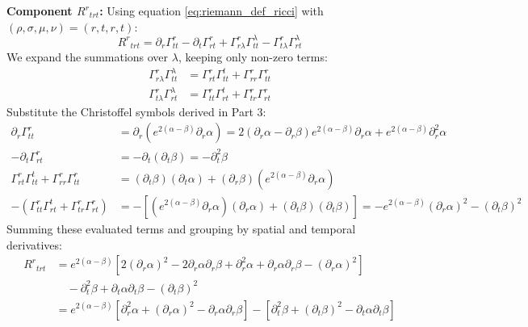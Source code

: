 \documentclass[11pt, a4paper]{report}
\begin{document}
\textbf{Component ${R^r}_{trt}$:}
Using equation \eqref{eq:riemann_def_ricci} with $(\rho, \sigma, \mu, \nu) = (r, t, r, t)$:
\begin{equation}
    {R^r}_{trt} = \partial_r \Gamma^r_{tt} - \partial_t \Gamma^r_{rt} + \Gamma^r_{r\lambda}\Gamma^\lambda_{tt} - \Gamma^r_{t\lambda}\Gamma^\lambda_{rt}
\end{equation}
We expand the summations over $\lambda$, keeping only non-zero terms:
\begin{align}
    \Gamma^r_{r\lambda}\Gamma^\lambda_{tt} &= \Gamma^r_{rt}\Gamma^t_{tt} + \Gamma^r_{rr}\Gamma^r_{tt} \\
    \Gamma^r_{t\lambda}\Gamma^\lambda_{rt} &= \Gamma^r_{tt}\Gamma^t_{rt} + \Gamma^r_{tr}\Gamma^r_{rt}
\end{align}
Substitute the Christoffel symbols derived in Part 3:
\begin{align}
    \partial_r \Gamma^r_{tt} &= \partial_r \left( e^{2(\alpha - \beta)} \partial_r \alpha \right) = 2(\partial_r \alpha - \partial_r \beta) e^{2(\alpha - \beta)} \partial_r \alpha + e^{2(\alpha - \beta)} \partial_r^2 \alpha \\
    -\partial_t \Gamma^r_{rt} &= -\partial_t (\partial_t \beta) = -\partial_t^2 \beta \\
    \Gamma^r_{rt}\Gamma^t_{tt} + \Gamma^r_{rr}\Gamma^r_{tt} &= (\partial_t \beta)(\partial_t \alpha) + (\partial_r \beta) \left( e^{2(\alpha - \beta)} \partial_r \alpha \right) \\
    -\left( \Gamma^r_{tt}\Gamma^t_{rt} + \Gamma^r_{tr}\Gamma^r_{rt} \right) &= -\left[ \left( e^{2(\alpha - \beta)} \partial_r \alpha \right) (\partial_r \alpha) + (\partial_t \beta)(\partial_t \beta) \right] = -e^{2(\alpha - \beta)} (\partial_r \alpha)^2 - (\partial_t \beta)^2
\end{align}
Summing these evaluated terms and grouping by spatial and temporal derivatives:
\begin{align}
    {R^r}_{trt} &= e^{2(\alpha - \beta)} \left[ 2(\partial_r \alpha)^2 - 2\partial_r \alpha \partial_r \beta + \partial_r^2 \alpha + \partial_r \alpha \partial_r \beta - (\partial_r \alpha)^2 \right] \nonumber \\
    &\quad - \partial_t^2 \beta + \partial_t \alpha \partial_t \beta - (\partial_t \beta)^2 \nonumber \\
    &= e^{2(\alpha - \beta)} \left[ \partial_r^2 \alpha + (\partial_r \alpha)^2 - \partial_r \alpha \partial_r \beta \right] - \left[ \partial_t^2 \beta + (\partial_t \beta)^2 - \partial_t \alpha \partial_t \beta \right] \label{eq:R_r_trt}
\end{align}
\end{document}
